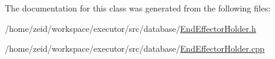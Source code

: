 The documentation for this class was generated from the following files:\begin{DoxyCompactItemize}
\item 
/home/zeid/workspace/executor/src/database/\hyperlink{_end_effector_holder_8h}{EndEffectorHolder.h}\item 
/home/zeid/workspace/executor/src/database/\hyperlink{_end_effector_holder_8cpp}{EndEffectorHolder.cpp}\end{DoxyCompactItemize}
